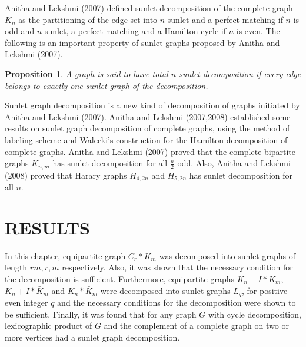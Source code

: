 \documentclass[12pt]{report}
\newtheorem{prop}[thm]{Proposition}
\begin{document}
Anitha and Lekshmi (2007)  %
  defined sunlet decomposition of the complete graph $K_n$ as the partitioning of the edge set into $n$-sunlet and a perfect matching if $n$ is odd and $n$-sunlet, a perfect matching and a Hamilton cycle if $n$ is even.
  The following is an important property of sunlet graphs proposed by Anitha and Lekshmi (2007).
  \begin{prop}
  A graph is said to have total $n$-sunlet decomposition if every edge belongs to exactly one sunlet graph of the decomposition.
  \end{prop}

  Sunlet graph decomposition is a new kind of decomposition of graphs initiated by  Anitha and Lekshmi (2007). %
  Anitha and Lekshmi (2007,2008) established some results on sunlet graph decomposition of complete graphs, using the method of  labeling scheme and Walecki's construction for the Hamilton decomposition of complete graphs. Anitha and Lekshmi (2007)%
 proved %
that the complete bipartite graphs $K_{n,m}$ has sunlet decomposition for all $\frac{n}{2}$ odd. Also, Anitha and Lekshmi (2008) proved %
 that Harary graphs $H_{4,2n}$ and $H_{5,2n}$ has sunlet decomposition for all $n$.

\chapter{RESULTS}
In this chapter, equipartite graph $C_r*\bar{K}_m$ was decomposed
into sunlet graphs of length $rm,r,m$ respectively. Also, it was
shown that the necessary condition for the decomposition is sufficient.
Furthermore, equipartite graphs $K_n-I*\bar{K}_m$,
$K_n+I*\bar{K}_m$ and $K_n*\bar{K}_m$ were decomposed into sunlet
graphs $L_q$, for positive even integer $q$ and the necessary
conditions for the decomposition were shown to be sufficient.
Finally, it was found that for any graph $G$ with cycle
decomposition, lexicographic product of $G$ and the complement of a
complete graph on two or more vertices had a sunlet graph decomposition.
\end{document}
